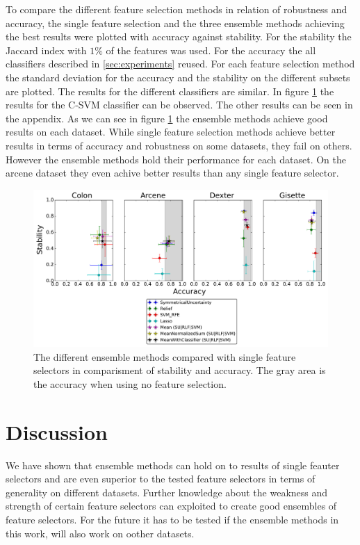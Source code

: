 \documentclass[twoside,11pt]{article}
\begin{document}
To compare the different feature selection methods in relation of robustness and accuracy, the single feature selection and the three ensemble methods achieving the best results were plotted with accuracy against stability. For the stability the Jaccard index with $1\%$ of the features was used. For the accuracy the all classifiers described in \ref{sec:experiments}  reused. For each feature selection method the standard deviation for the accuracy and the stability on the different subsets are plotted. The results for the different classifiers are similar. In figure \ref{fig:boxplot_svm} the results for the C-SVM classifier can be observed. The other results can be seen in the appendix. %
As we can see in figure \ref{fig:boxplot_svm} the ensemble methods achieve good results on each dataset. While single feature selection methods achieve better results in terms of accuracy and robustness on some datasets, they fail on others. However the ensemble methods hold their performance for each dataset. On the arcene dataset they even achive better results than any single feature selector.

\begin{figure}[H]
  \centering
    \includegraphics[width=\textwidth]{images/boxplot_svm.pdf}
  \caption{The different ensemble methods compared with single feature selectors in comparisment of stability and accuracy.
  The gray area is the accuracy when using no feature selection.}
  \label{fig:boxplot_svm}
\end{figure}

\section{Discussion}
We have shown that ensemble methods can hold on to results of single feauter selectors and are even superior to the tested feature selectors in terms of generality on different datasets. Further knowledge about the weakness and strength of certain feature selectors can exploited to create good ensembles of feature selectors. For the future it has to be tested if the ensemble methods in this work, will also work on oother datasets.
\end{document}
